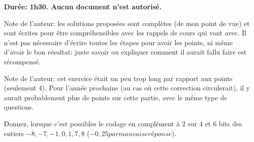 \def\modulename{pcp}
\RequirePackage[utf8]{course}
\pcp
\newif\ifsolution
\solutionfalse

\usepackage{caption}
\usepackage{subcaption}
\usepackage{units}
\usepackage{listings}
\usepackage{Cdefs}
\usepackage{tikz}
\usetikzlibrary{arrows}


\def\consigne#1{\null\begin{center}\parbox{13cm}{\large #1}\end{center}\relax}

\def\Question#1#2{\question{}\textbf{(#2)} #1}
\ifsolution
\includecomment{solution}
\else
{}
\fi


\controlecontinu

\consigne{{\bf Dur{\'e}e: 1h30. Aucun document n'est autorisé.}}

\begin{solution}
  Note de l'auteur: les solutions proposées sont complètes (de mon
  point de vue) et sont écrites pour être compréhensibles avec les
  rappels de cours qui vont avec. Il n'est pas nécessaire d'écrire
  toutes les étapes pour avoir les points, ni même d'avoir le bon
  résultat: juste savoir ou expliquer comment il aurait fallu faire
  est récompensé.
\end{solution}

\vspace*{1em}


\begin{solution}
  Note de l'auteur: cet exercice était un peu trop long par rapport
  aux points (seulement 4).  Pour l'année prochaine (au cas où cette
  correction circulerait), il y aurait probablement plus de points sur
  cette partie, avec le même type de questions.
\end{solution}

\question Donnez, lorsque c'est possibles le codage en complément à 2
sur \(4\) et \(6\) bits des entiers \(-8,-7,-1,0,1,7,8\) (\(-0,25 par mauvaise réponse\)).




